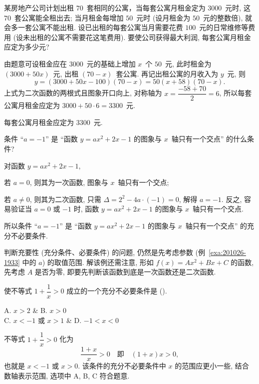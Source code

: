 \begin{example}
  某房地产公司计划出租 $70$~套相同的公寓，当每套公寓月租金定为 $3000$~元时, 这 $70$~套公寓能全租出去; 当月租金每增加 $50$~元时 (设月租金为 $50$~元的整数倍), 就会多一套公寓不能出租. 设已出租的每套公寓当月需要花费 $100$~元的日常维修等费用 (设未出租的公寓不需要花这笔费用). 要使公司获得最大利润, 每套公寓月租金应定为多少元?
\end{example}
\begin{solution}
  由题意可设租金应在 $3000$~元的基础上增加 $x$~个 $50$~元, 此时租金为 $(3000+50x)$~元, 出租 $(70-x)$~套公寓. 再记出租公寓的月收入为 $y$~元, 则
  \[y=(3000+50x-100)(70-x)= 50(x+58)(70-x).\]
  上式为二次函数的两根式且图象开口向上, 对称轴为 $x=\dfrac{-58+70}2=6$, 所以每套公寓月租金应定为 $3000+50\cdot 6= 3300$~元.
\end{solution}
\begin{answer}
  每套公寓月租金应定为 $3300$~元.
\end{answer}

\begin{example}\label{exa:201026-1933}
  条件 ``$a=-1$'' 是 ``函数 $y=ax^2+2x-1$ 的图象与 $x$~轴只有一个交点'' 的什么条件?
\end{example}
\begin{solution}
  对函数 $y=ax^2+2x-1$, 
  
  若 $a=0$, 则其为一次函数, 图象与 $x$~轴只有一个交点; 
  
  若 $a\neq 0$, 则其为二次函数, 只需 $\Delta= 2^2-4a\cdot(-1)=0$, 解得 $a=-1$. 反之, 容易验证当 $a=0$ 或 $-1$ 时, 函数 $y=ax^2+2x-1$ 的图象与 $x$~轴只有一个交点. 
  
  所以条件 ``$a=-1$'' 是 ``函数 $y=ax^2+2x-1$ 的图象与 $x$~轴只有一个交点'' 的充分不必要条件.
\end{solution}

判断充要性 (充分条件、必要条件) 的问题, 仍然是先考虑参数 (例~\ref{exa:201026-1933} 中的 $a$) 的取值范围. 解该例还需注意, 形如 $f(x)=Ax^2+Bx+C$ 的函数, 先考虑 $A$ 是否为零, 即要先判断该函数到底是一次函数还是二次函数.

\begin{example}
  使不等式 $1+\dfrac1x>0$ 成立的一个充分不必要条件是 (\qquad).
  \begin{twocolpro}
  A. $x>2$ & B. $x>0$ \\
  C. $x<-1$ 或 $x>1$ & D. $-1<x<0$
  \end{twocolpro}
\end{example}
\begin{solution}
  不等式 $1+\dfrac1x>0$ 化为 
  \[\dfrac{1+x}x>0\quad\text{即}\quad (1+x)x>0,\]
  也就是 $x<-1$ 或 $x>0$. 该条件的充分不必要条件中 $x$ 的范围应更小一些, 结合数轴表示范围, 选项中 A, B, C 符合题意.
\end{solution}


